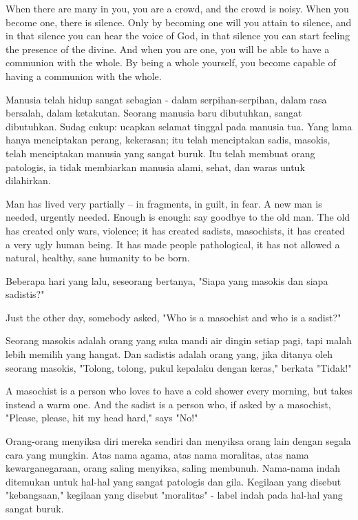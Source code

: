 \english
When there are many in you, you are a crowd, and the crowd is noisy. When you become one, there is silence. Only by becoming one will you attain to silence, and in that silence you can hear the voice of God, in that silence you can start feeling the presence of the divine. And when you are one, you will be able to have a communion with the whole. By being a whole yourself, you become capable of having a communion with the whole.

\bahasa
Manusia telah hidup sangat sebagian - dalam serpihan-serpihan, dalam rasa bersalah, dalam ketakutan. Seorang manusia baru dibutuhkan, sangat dibutuhkan. Sudag cukup: ucapkan selamat tinggal pada manusia tua. Yang lama hanya menciptakan perang, kekerasan; itu telah menciptakan sadis, masokis, telah menciptakan manusia yang sangat buruk. Itu telah membuat orang patologis, ia tidak membiarkan manusia alami, sehat, dan waras untuk dilahirkan.

\english
Man has lived very partially -- in fragments, in guilt, in fear. A new man is needed, urgently needed. Enough is enough: say goodbye to the old man. The old has created only wars, violence; it has created sadists, masochists, it has created a very ugly human being. It has made people pathological, it has not allowed a natural, healthy, sane humanity to be born.

\bahasa
Beberapa hari yang lalu, seseorang bertanya, "Siapa yang masokis dan siapa sadistis?"

\english
Just the other day, somebody asked, "Who is a masochist and who is a sadist?"

\bahasa
Seorang masokis adalah orang yang suka mandi air dingin setiap pagi, tapi malah lebih memilih yang hangat. Dan sadistis adalah orang yang, jika ditanya oleh seorang masokis, "Tolong, tolong, pukul kepalaku dengan keras," berkata "Tidak!"

\english
A masochist is a person who loves to have a cold shower every morning, but takes instead a warm one. And the sadist is a person who, if asked by a masochist, "Please, please, hit my head hard," says "No!"

\bahasa
Orang-orang menyiksa diri mereka sendiri dan menyiksa orang lain dengan segala cara yang mungkin. Atas nama agama, atas nama moralitas, atas nama kewarganegaraan, orang saling menyiksa, saling membunuh. Nama-nama indah ditemukan untuk hal-hal yang sangat patologis dan gila. Kegilaan yang disebut "kebangsaan," kegilaan yang disebut "moralitas" - label indah pada hal-hal yang sangat buruk.

